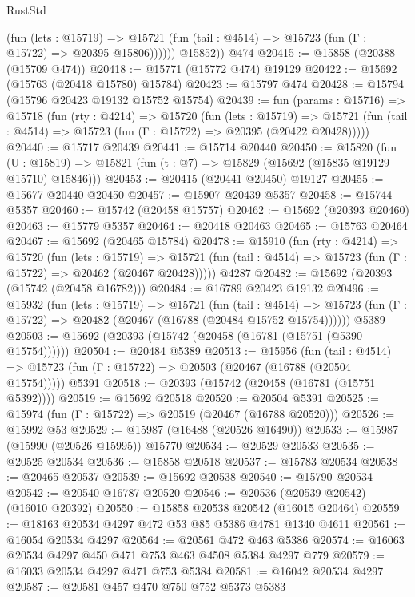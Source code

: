 \begin{lexlean}{RustStd}
\begin{coremodule}
              (fun (lets : @15719) =>
              @15721 (fun (tail : @4514) => @15723 (fun (Γ : @15722) => @20395 @15806))))))
        @15852))
    @474
@20415 := @15858 (@20388 (@15709 @474))
@20418 := @15771 (@15772 @474) @19129
@20422 := @15692 (@15763 (@20418 @15780) @15784)
@20423 := @15797 @474
@20428 := @15794 (@15796 @20423 @19132 @15752 @15754)
@20439 := fun (params : @15716) =>
  @15718
    (fun (rty : @4214) =>
    @15720
      (fun (lets : @15719) =>
      @15721 (fun (tail : @4514) => @15723 (fun (Γ : @15722) => @20395 (@20422 @20428)))))
@20440 := @15717 @20439
@20441 := @15714 @20440
@20450 := @15820
    (fun (U : @15819) => @15821 (fun (t : @7) => @15829 (@15692 (@15835 @19129 @15710) @15846)))
@20453 := @20415 (@20441 @20450) @19127
@20455 := @15677 @20440 @20450
@20457 := @15907 @20439 @5357
@20458 := @15744 @5357
@20460 := @15742 (@20458 @15757)
@20462 := @15692 (@20393 @20460)
@20463 := @15779 @5357
@20464 := @20418 @20463
@20465 := @15763 @20464
@20467 := @15692 (@20465 @15784)
@20478 := @15910
    (fun (rty : @4214) =>
    @15720
      (fun (lets : @15719) =>
      @15721 (fun (tail : @4514) => @15723 (fun (Γ : @15722) => @20462 (@20467 @20428)))))
    @4287
@20482 := @15692 (@20393 (@15742 (@20458 @16782)))
@20484 := @16789 @20423 @19132
@20496 := @15932
    (fun (lets : @15719) =>
    @15721
      (fun (tail : @4514) =>
      @15723 (fun (Γ : @15722) => @20482 (@20467 (@16788 (@20484 @15752 @15754))))))
    @5389
@20503 := @15692 (@20393 (@15742 (@20458 (@16781 (@15751 (@5390 @15754))))))
@20504 := @20484 @5389
@20513 := @15956
    (fun (tail : @4514) => @15723 (fun (Γ : @15722) => @20503 (@20467 (@16788 (@20504 @15754)))))
    @5391
@20518 := @20393 (@15742 (@20458 (@16781 (@15751 @5392))))
@20519 := @15692 @20518
@20520 := @20504 @5391
@20525 := @15974 (fun (Γ : @15722) => @20519 (@20467 (@16788 @20520)))
@20526 := @15992 @53
@20529 := @15987 (@16488 (@20526 @16490))
@20533 := @15987 (@15990 (@20526 @15995)) @15770
@20534 := @20529 @20533
@20535 := @20525 @20534
@20536 := @15858 @20518
@20537 := @15783 @20534
@20538 := @20465 @20537
@20539 := @15692 @20538
@20540 := @15790 @20534
@20542 := @20540 @16787 @20520
@20546 := @20536 (@20539 @20542) (@16010 @20392)
@20550 := @15858 @20538 @20542 (@16015 @20464)
@20559 := @18163 @20534 @4297 @472 @53 @85 @5386 @4781 @1340 @4611
@20561 := @16054 @20534 @4297
@20564 := @20561 @472 @463 @5386
@20574 := @16063 @20534 @4297 @450 @471 @753 @463 @4508 @5384 @4297 @779
@20579 := @16033 @20534 @4297 @471 @753 @5384
@20581 := @16042 @20534 @4297
@20587 := @20581 @457 @470 @750 @752 @5373 @5383

\end{coremodule}
\end{lexlean}
